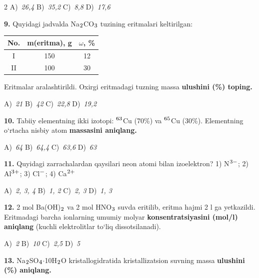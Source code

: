 \documentclass[11pt,a4paper]{article}
\renewcommand{\textsubscript}[1]{\ensuremath{_{\text{\fontsize{8}{8}\selectfont #1}}}}
\renewcommand{\textsuperscript}[1]{\ensuremath{^{\text{\fontsize{8}{8}\selectfont #1}}}}
\begin{document}
\begin{multicols}{2}
\noindent A)~\textsl{26,4} \hfill B)~\textsl{35,2} \hfill C)~\textsl{8,8} \hfill D)~\textsl{17,6}\par
\vspace{4pt}
\noindent\textbf{9.} Quyidagi jadvalda Na\textsubscript{2}CO\textsubscript{3} tuzining eritmalari keltirilgan:
\begin{center}
\renewcommand{\arraystretch}{1.15}
\begin{tabular}{|c|c|c|}\hline
\textbf{No.} & \textbf{m(eritma), g} & \textbf{$\omega$, \%} \\ \hline
I & 150 & 12 \\ \hline
II & 100 & 30 \\ \hline
\end{tabular}
\end{center}
Eritmalar aralashtirildi. Oxirgi eritmadagi tuzning massa \textbf{ulushini (\%) toping.}

\noindent A)~\textsl{21} \hfill B)~\textsl{42} \hfill C)~\textsl{22,8} \hfill D)~\textsl{19,2}\par
\vspace{4pt}
\noindent\textbf{10.} Tabiiy elementning ikki izotopi: \textsuperscript{63}Cu (70\%) va \textsuperscript{65}Cu (30\%). Elementning o`rtacha nisbiy atom \textbf{massasini aniqlang.}

\noindent A)~\textsl{64} \hfill B)~\textsl{64,4} \hfill C)~\textsl{63,6} \hfill D)~\textsl{63}\par
\vspace{4pt}
\noindent\textbf{11.} Quyidagi zarrachalardan qaysilari neon atomi bilan izoelektron? 1) N\textsuperscript{3$-$}; 2) Al\textsuperscript{3+}; 3) Cl\textsuperscript{$-$}; 4) Ca\textsuperscript{2+}

\noindent A)~\textsl{2, 3, 4} \hfill B)~\textsl{1, 2} \hfill C)~\textsl{2, 3} \hfill D)~\textsl{1, 3}\par
\vspace{4pt}
\noindent\textbf{12.} 2 mol Ba(OH)\textsubscript{2} va 2 mol HNO\textsubscript{3} suvda eritilib, eritma hajmi 2 l ga yetkazildi. Eritmadagi barcha ionlarning umumiy molyar \textbf{konsentratsiyasini (mol/l) aniqlang} (kuchli elektrolitlar to`liq dissotsilanadi).

\noindent A)~\textsl{2} \hfill B)~\textsl{10} \hfill C)~\textsl{2,5} \hfill D)~\textsl{5}\par
\vspace{4pt}
\noindent\textbf{13.} Na\textsubscript{2}SO\textsubscript{4}$\cdot$10H\textsubscript{2}O kristallogidratida kristallizatsion suvning massa \textbf{ulushini (\%) aniqlang.}


\end{multicols}
\end{document}
